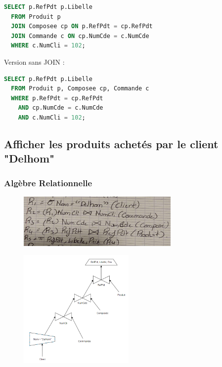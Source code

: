 \documentclass{article}
\begin{document}
\begin{lstlisting}[language=SQL]
  SELECT p.RefPdt p.Libelle 
  FROM Produit p
  JOIN Composee cp ON p.RefPdt = cp.RefPdt
  JOIN Commande c ON cp.NumCde = c.NumCde
  WHERE c.NumCli = 102;
\end{lstlisting}

Version sans JOIN :

\begin{lstlisting}[language=SQL]
  SELECT p.RefPdt p.Libelle 
  FROM Produit p, Composee cp, Commande c
  WHERE p.RefPdt = cp.RefPdt 
    AND cp.NumCde = c.NumCde 
    AND c.NumCli = 102;
\end{lstlisting}

\subsection{Afficher les produits achetés par le client "Delhom"}

\subsubsection{Algèbre Relationnelle}

\begin{figure}[H]
  \centering
  \includegraphics[width=0.7\textwidth]{alg/6.png}
  \label{fig:alg-rel}
\end{figure}

\begin{figure}[H]
  \centering
  \includegraphics[width=0.5\textwidth]{algRel/6.png}
  \label{fig:alg-rel}
\end{figure}
\end{document}
